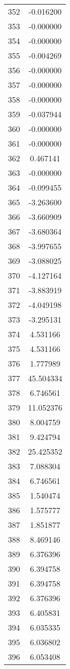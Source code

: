 \documentclass[12pt]{article}
\begin{document}
\begin{longtable}{@{}cc@{}}
352 & -0.016200 \\
353 & -0.000000 \\
354 & -0.000000 \\
355 & -0.004269 \\
356 & -0.000000 \\
357 & -0.000000 \\
358 & -0.000000 \\
359 & -0.037944 \\
360 & -0.000000 \\
361 & -0.000000 \\
362 & 0.467141 \\
363 & -0.000000 \\
364 & -0.099455 \\
365 & -3.263600 \\
366 & -3.660909 \\
367 & -3.680364 \\
368 & -3.997655 \\
369 & -3.088025 \\
370 & -4.127164 \\
371 & -3.883919 \\
372 & -4.049198 \\
373 & -3.295131 \\
374 & 4.531166 \\
375 & 4.531166 \\
376 & 1.777989 \\
377 & 45.504334 \\
378 & 6.746561 \\
379 & 11.052376 \\
380 & 8.004759 \\
381 & 9.424794 \\
382 & 25.425352 \\
383 & 7.088304 \\
384 & 6.746561 \\
385 & 1.540474 \\
386 & 1.575777 \\
387 & 1.851877 \\
388 & 8.469146 \\
389 & 6.376396 \\
390 & 6.394758 \\
391 & 6.394758 \\
392 & 6.376396 \\
393 & 6.405831 \\
394 & 6.035335 \\
395 & 6.036802 \\
396 & 6.053408 \\

\end{longtable}
\end{document}
